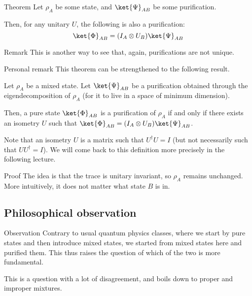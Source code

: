 \documentclass[a4paper]{article}
\begin{document}
\begin{parag}{Theorem}
    Let $\rho_A$ be some state, and $\ket{\Psi}_{AB}$ be some purification.

    Then, for any unitary $U$, the following is also a purification: 
    \[\ket{\Phi}_{AB} = \left(I_A \otimes U_B\right) \ket{\Psi}_{AB}\]

    \begin{subparag}{Remark}
        This is another way to see that, again, purifications are not unique.
    \end{subparag}

    \begin{subparag}{Personal remark}
        This theorem can be strengthened to the following result.

        Let $\rho_A$ be a mixed state. Let $\ket{\Psi}_{AB}$ be a purification obtained through the eigendecomposition of $\rho_A$ (for it to live in a space of minimum dimension).

        Then, a pure state $\ket{\Phi}_{AB}$ is a purification of $\rho_{A}$ if and only if there exists an isometry $U$ such that  $\ket{\Phi}_{AB} = \left(I_A \otimes U_B\right) \ket{\Psi}_{AB}$. 

        Note that an isometry $U$ is a matrix such that $U^{\dagger} U = I$ (but not necessarily such that $U U^{\dagger} = I$). We will come back to this definition more precisely in the following lecture.
    \end{subparag}

    \begin{subparag}{Proof}
        The idea is that the trace is unitary invariant, so $\rho_A$ remains unchanged. More intuitively, it does not matter what state $B$ is in.
    \end{subparag}
\end{parag}

\subsection{Philosophical observation}

\begin{parag}{Observation}
    Contrary to usual quantum physics classes, where we start by pure states and then introduce mixed states, we started from mixed states here and purified them. This thus raises the question of which of the two is more fundamental. 

    This is a question with a lot of disagreement, and boils down to proper and improper mixtures.
\end{parag}
\end{document}
